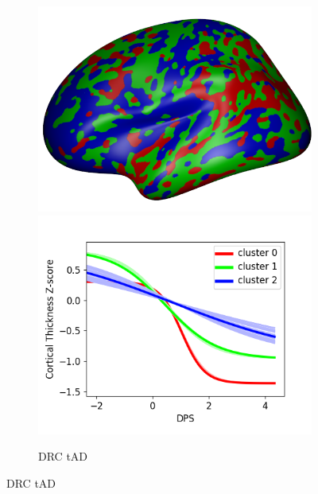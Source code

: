 \begin{figure}
  \begin{subfigure}[b]{\textwidth}
   \centering
  \includegraphics[width=\scalingFactorSubfigBrain \textwidth,trim=0 0 0 20,clip]{images/atrophyExtent24_drcThInitk-meansCl3Pr1Ra1_VDPM_MRFAD.png} \includegraphics[width=\scalingFactorSubfigBrain \textwidth,trim=0 10 0 30,clip]{images/trajSamplesOneFig_drcThInitk-meansCl3Pr1Ra1_VDPM_MRFAD.png}
    \caption{DRC tAD}
    \label{diveClustDrcAd}
  \end{subfigure}
  

\end{figure}
